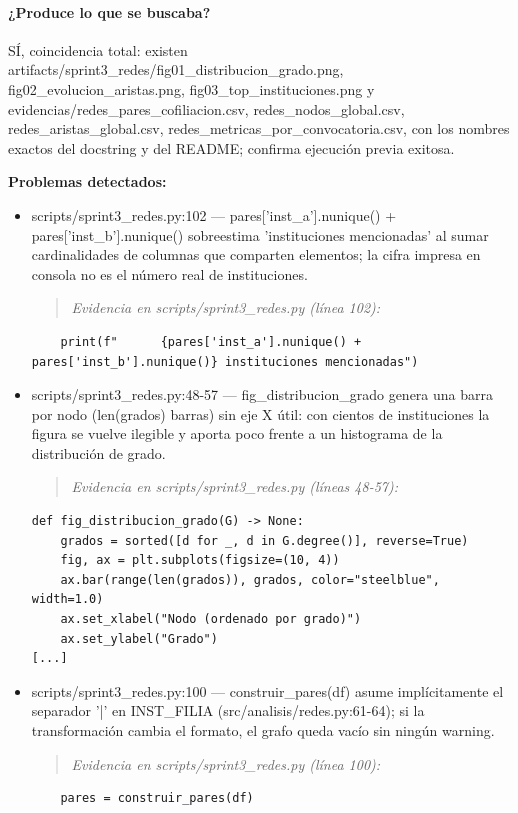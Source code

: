 \paragraph{¿Produce lo que se buscaba?}
SÍ, coincidencia total: existen artifacts/sprint3\_redes/fig01\_distribucion\_grado.png, fig02\_evolucion\_aristas.png, fig03\_top\_instituciones.png y evidencias/redes\_pares\_cofiliacion.csv, redes\_nodos\_global.csv, redes\_aristas\_global.csv, redes\_metricas\_por\_convocatoria.csv, con los nombres exactos del docstring y del README; confirma ejecución previa exitosa.

\begin{tcolorbox}[riesgo]
\textbf{Problemas detectados:}
\begin{itemize}
  \item scripts/sprint3\_redes.py:102 --- pares['inst\_a'].nunique() + pares['inst\_b'].nunique() sobreestima 'instituciones mencionadas' al sumar cardinalidades de columnas que comparten elementos; la cifra impresa en consola no es el número real de instituciones.
\begin{quote}\footnotesize\ttfamily
\noindent\emph{Evidencia en scripts/sprint3\_redes.py (línea 102):}
\end{quote}
\begin{lstlisting}
    print(f"      {pares['inst_a'].nunique() + pares['inst_b'].nunique()} instituciones mencionadas")
\end{lstlisting}

  \item scripts/sprint3\_redes.py:48-57 --- fig\_distribucion\_grado genera una barra por nodo (len(grados) barras) sin eje X útil: con cientos de instituciones la figura se vuelve ilegible y aporta poco frente a un histograma de la distribución de grado.
\begin{quote}\footnotesize\ttfamily
\noindent\emph{Evidencia en scripts/sprint3\_redes.py (líneas 48-57):}
\end{quote}
\begin{lstlisting}
def fig_distribucion_grado(G) -> None:
    grados = sorted([d for _, d in G.degree()], reverse=True)
    fig, ax = plt.subplots(figsize=(10, 4))
    ax.bar(range(len(grados)), grados, color="steelblue", width=1.0)
    ax.set_xlabel("Nodo (ordenado por grado)")
    ax.set_ylabel("Grado")
[...]
\end{lstlisting}

  \item scripts/sprint3\_redes.py:100 --- construir\_pares(df) asume implícitamente el separador '|' en INST\_FILIA (src/analisis/redes.py:61-64); si la transformación cambia el formato, el grafo queda vacío sin ningún warning.
\begin{quote}\footnotesize\ttfamily
\noindent\emph{Evidencia en scripts/sprint3\_redes.py (línea 100):}
\end{quote}
\begin{lstlisting}
    pares = construir_pares(df)
\end{lstlisting}


\end{itemize}
\end{tcolorbox}
